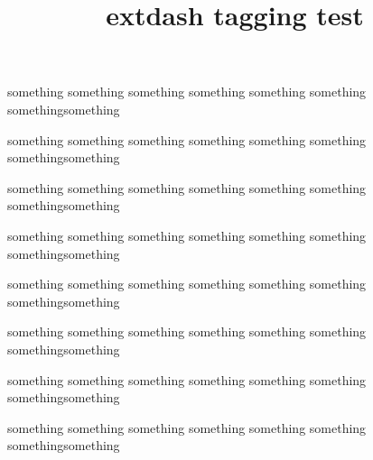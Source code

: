 \documentclass{article}
\title{extdash tagging test}
\begin{document}
something something something something something something something\Hyphdash something

something something something something something something something\Hyphdash* something

something something something something something something something\Endash something

something something something something something something something\Endash* something

something something something something something something something\Emdash something

something something something something something something something\Emdash* something

something something something something something something something\Halfspace something

something something something something something something something\Halfspace* something
\end{document}
